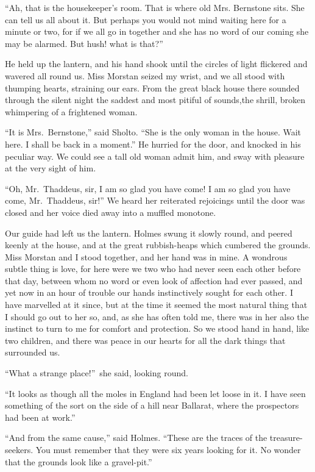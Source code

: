 \documentclass[12pt,english,oneside]{book}
\begin{document}
{}``Ah, that is the housekeeper's room. That is where old Mrs. Bernstone
sits. She can tell us all about it. But perhaps you would not mind
waiting here for a minute or two, for if we all go in together and
she has no word of our coming she may be alarmed. But hush! what is
that?''

He held up the lantern, and his hand shook until the circles of light
flickered and wavered all round us. Miss Morstan seized my wrist,
and we all stood with thumping hearts, straining our ears. From the
great black house there sounded through the silent night the saddest
and most pitiful of sounds,\mdsh{---}the shrill, broken whimpering
of a frightened woman.

{}``It is Mrs.\ Bernstone,'' said Sholto. {}``She is the only
woman in the house. Wait here. I shall be back in a moment.'' He
hurried for the door, and knocked in his peculiar way. We could see
a tall old woman admit him, and sway with pleasure at the very sight
of him.

{}``Oh, Mr.\ Thaddeus, sir, I am so glad you have come! I am so
glad you have come, Mr.\ Thaddeus, sir!'' We heard her reiterated
rejoicings until the door was closed and her voice died away into
a muffled monotone.

Our guide had left us the lantern. Holmes swung it slowly round, and
peered keenly at the house, and at the great rubbish-heaps which cumbered
the grounds. Miss Morstan and I stood together, and her hand was in
mine. A wondrous subtle thing is love, for here were we two who had
never seen each other before that day, between whom no word or even
look of affection had ever passed, and yet now in an hour of trouble
our hands instinctively sought for each other. I have marvelled at
it since, but at the time it seemed the most natural thing that I
should go out to her so, and, as she has often told me, there was
in her also the instinct to turn to me for comfort and protection.
So we stood hand in hand, like two children, and there was peace in
our hearts for all the dark things that surrounded us.

{}``What a strange place!''\ she said, looking round.

{}``It looks as though all the moles in England had been let loose
in it. I have seen something of the sort on the side of a hill near
Ballarat, where the prospectors had been at work.''

{}``And from the same cause,'' said Holmes. {}``These are the traces
of the treasure-seekers. You must remember that they were six years
looking for it. No wonder that the grounds look like a gravel-pit.''
\end{document}
